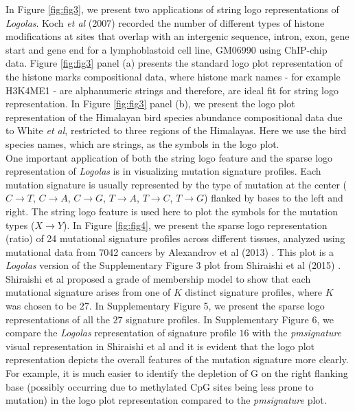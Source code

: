 \documentclass{bmcart}
\begin{document}
In Figure \ref{fig:fig3}, we present two applications of string logo representations of \textit{Logolas}. Koch \textit{et al} (2007) \cite{Koch2007} recorded the number of different types of histone modifications at sites that overlap with an intergenic sequence, intron, exon, gene start and gene end for a lymphoblastoid cell line, GM06990 using ChIP-chip data. Figure \ref{fig:fig3} panel (a) presents the standard logo plot representation of the histone marks compositional data, where histone mark names - for example H3K4ME1 - are alphanumeric strings and therefore, are ideal fit for string logo representation. In Figure \ref{fig:fig3} panel (b), we present the logo plot representation of the Himalayan bird species abundance compositional data due to White \textit{et al}, restricted to three regions of the Himalayas. Here we use the bird species names, which are strings, as the symbols in the logo plot. \\[3 pt]

One important application of both the string logo feature and the sparse logo representation of \textit{Logolas} is in visualizing mutation signature profiles. Each mutation signature is usually represented by the type of mutation at the center ($C \rightarrow T$, $C \rightarrow A$, $C \rightarrow G$, $T \rightarrow A$, $T \rightarrow C$, $T \rightarrow G$) flanked by bases to the left and right. The string logo feature is used here to plot the symbols for the mutation types ($ X \rightarrow Y$). In Figure \ref{fig:fig4}, we present the sparse logo representation (ratio) of 24 mutational signature profiles across different tissues, analyzed using mutational data from 7042 cancers by Alexandrov et al (2013) \cite{Alexandrov2013}. This plot is a \textit{Logolas} version of the Supplementary Figure 3 plot from Shiraishi et al (2015) \cite{Shiraishi2015}. Shiraishi et al \cite{Shiraishi2015} proposed a grade of membership model to show that each mutational signature arises from one of $K$ distinct signature profiles, where $K$ was chosen to be $27$. In Supplementary Figure 5, we present the sparse logo representations of all the $27$ signature profiles. In Supplementary Figure 6, we compare the \textit{Logolas} representation of signature profile $16$ with the \textit{pmsignature} visual representation in Shiraishi et al \cite{Shiraishi2015} and it is evident that the logo plot representation depicts the overall features of the mutation signature more clearly. For example, it is much easier to identify the depletion of G on the right flanking base (possibly occurring due to methylated CpG sites being less prone to mutation) in the logo plot representation compared to the \textit{pmsignature} plot. \\ [3 pt]
\end{document}
